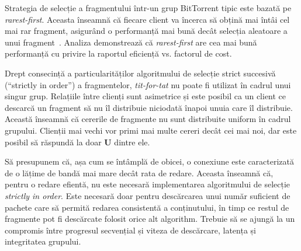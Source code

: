 Strategia de selecție a fragmentului într-un grup BitTorrent tipic este bazată
pe \textit{rarest-first}. Aceasta înseamnă că fiecare client va încerca să
obțină mai întâi cel mai rar fragment, asigurând o performanță mai bună decât
selecția aleatoare a unui fragment~\cite{bt-analysis}\cite{scaling-networks}.
Analiza demonstrează că \textit{rarest-first} are cea mai bună performanță cu
privire la raportul eficiență vs. factorul de cost.

Drept consecință a particularităților algoritmului de selecție strict
succesivă (``strictly in order'') a fragmentelor, \textit{tit-for-tat} nu
poate fi utilizat în cadrul unui singur grup. Relațiile între clienți sunt
asimetrice și este posibil ca un client ce descarcă un fragment să nu îl
distribuie niciodată înapoi unuia care îl distribuie. Această înseamnă că
cererile de fragmente nu sunt distribuite uniform în cadrul grupului. Clienții
mai vechi vor primi mai multe cereri decât cei mai noi, dar este posibil să
răspundă la doar \textbf{U} dintre ele.

Să presupunem că, așa cum se întâmplă de obicei, o conexiune este caracterizată
de o lățime de bandă mai mare decât rata de redare. Aceasta înseamnă că, pentru
o redare efientă, nu este necesară implementarea algoritmului de selecție
\textit{strictly in order}. Este necesară doar pentru descărcarea unui număr
suficient de pachete care să permită redarea consistentă a conținutului, în
timp ce restul de fragmente pot fi descărcate folosit orice alt algorithm.
Trebuie să se ajungă la un compromis între progresul secvențial și viteza de
descărcare, latența și integritatea grupului.

